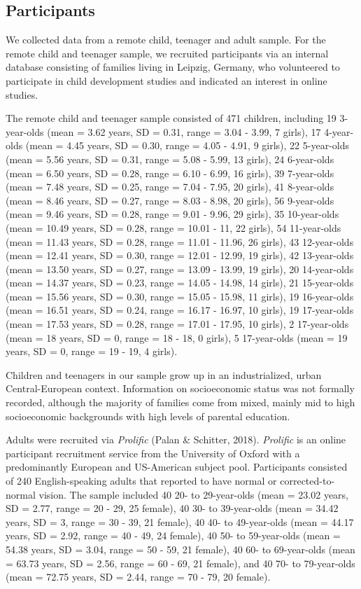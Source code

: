\documentclass[
  man,floatsintext]{apa6}
\begin{document}
\hypertarget{participants}{%
\subsection{Participants}\label{participants}}

We collected data from a remote child, teenager and adult sample.
For the remote child and teenager sample, we recruited participants via an internal database consisting of families living in Leipzig, Germany, who volunteered to participate in child development studies and indicated an interest in online studies.

The remote child and teenager sample consisted of 471 children, including 19 3-year-olds (mean = 3.62 years, SD = 0.31, range = 3.04 - 3.99, 7 girls), 17 4-year-olds (mean = 4.45 years, SD = 0.30, range = 4.05 - 4.91, 9 girls), 22 5-year-olds (mean = 5.56 years, SD = 0.31, range = 5.08 - 5.99, 13 girls), 24 6-year-olds (mean = 6.50 years, SD = 0.28, range = 6.10 - 6.99, 16 girls), 39 7-year-olds (mean = 7.48 years, SD = 0.25, range = 7.04 - 7.95, 20 girls), 41 8-year-olds (mean = 8.46 years, SD = 0.27, range = 8.03 - 8.98, 20 girls), 56 9-year-olds (mean = 9.46 years, SD = 0.28, range = 9.01 - 9.96, 29 girls), 35 10-year-olds (mean = 10.49 years, SD = 0.28, range = 10.01 - 11, 22 girls), 54 11-year-olds (mean = 11.43 years, SD = 0.28, range = 11.01 - 11.96, 26 girls), 43 12-year-olds (mean = 12.41 years, SD = 0.30, range = 12.01 - 12.99, 19 girls), 42 13-year-olds (mean = 13.50 years, SD = 0.27, range = 13.09 - 13.99, 19 girls), 20 14-year-olds (mean = 14.37 years, SD = 0.23, range = 14.05 - 14.98, 14 girls), 21 15-year-olds (mean = 15.56 years, SD = 0.30, range = 15.05 - 15.98, 11 girls), 19 16-year-olds (mean = 16.51 years, SD = 0.24, range = 16.17 - 16.97, 10 girls), 19 17-year-olds (mean = 17.53 years, SD = 0.28, range = 17.01 - 17.95, 10 girls), 2 17-year-olds (mean = 18 years, SD = 0, range = 18 - 18, 0 girls),
5 17-year-olds (mean = 19 years, SD = 0, range = 19 - 19, 4 girls).

Children and teenagers in our sample grow up in an industrialized, urban Central-European context.
Information on socioeconomic status was not formally recorded, although the majority of families come from mixed, mainly mid to high socioeconomic backgrounds with high levels of parental education.

Adults were recruited via \emph{Prolific} (Palan \& Schitter, 2018). \emph{Prolific} is an online participant recruitment service from the University of Oxford with a predominantly European and US-American subject pool. Participants consisted of 240 English-speaking adults that reported to have normal or corrected-to-normal vision. The sample included 40 20- to 29-year-olds (mean = 23.02 years, SD = 2.77, range = 20 - 29, 25 female),
40 30- to 39-year-olds (mean = 34.42 years, SD = 3, range = 30 - 39, 21 female),
40 40- to 49-year-olds (mean = 44.17 years, SD = 2.92, range = 40 - 49, 24 female),
40 50- to 59-year-olds (mean = 54.38 years, SD = 3.04, range = 50 - 59, 21 female),
40 60- to 69-year-olds (mean = 63.73 years, SD = 2.56, range = 60 - 69, 21 female), and
40 70- to 79-year-olds (mean = 72.75 years, SD = 2.44, range = 70 - 79, 20 female).
\end{document}
